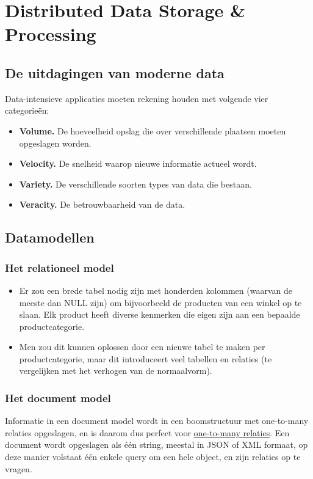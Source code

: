 \part{Distributed Data Storage \& Processing}
	\chapter{De uitdagingen van moderne data}
	Data-intensieve applicaties moeten rekening houden met volgende vier categorieën:
	\begin{itemize}
		\item[\info]\textbf{Volume.} De hoeveelheid opslag die over verschillende plaatsen moeten opgeslagen worden.
		\item[\info]\textbf{Velocity.} De snelheid waarop nieuwe informatie actueel wordt.
		\item[\info]\textbf{Variety.} De verschillende soorten types van data die bestaan. 
		\item[\info]\textbf{Veracity.} De betrouwbaarheid van de data. 
	\end{itemize}
	\chapter{Datamodellen}
	\section{Het relationeel model}
	\begin{itemize}
		\item[\alert] Er zou een brede tabel nodig zijn met honderden kolommen (waarvan de meeste dan NULL zijn) om bijvoorbeeld de producten van een winkel op te slaan. Elk product heeft diverse kenmerken die eigen zijn aan een bepaalde productcategorie.
		\item[\alert] Men zou dit kunnen oplossen door een nieuwe tabel te maken per productcategorie, maar dit introduceert veel tabellen en relaties (te vergelijken met het verhogen van de normaalvorm).
	\end{itemize}
	\section{Het document model}
	Informatie in een document model wordt in een boomstructuur met one-to-many relaties opgeslagen, en is daarom dus perfect voor \underline{one-to-many relaties}. Een document wordt opgeslagen als één string, meestal in JSON of XML formaat, op deze manier volstaat één enkele query om een hele object, en zijn relaties op te vragen. 

